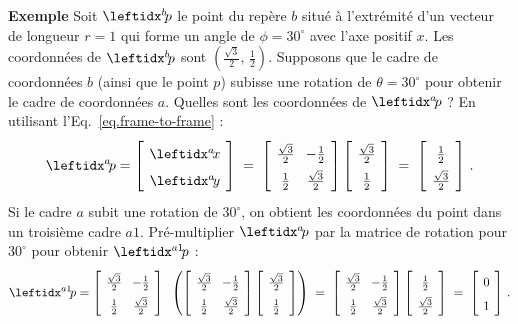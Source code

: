 \noindent\textbf{Exemple} Soit $\bp$ le point du repère $b$ situé à l'extrémité d'un vecteur de longueur $r=1$ qui forme un angle de $\phi=30^{\circ}$ avec l'axe positif $x$. Les coordonnées de $\bp$ sont $\left(\frac{\sqrt{3}}{2},\,\frac{1}{2}\right)$. Supposons que le cadre de coordonnées $b$ (ainsi que le point $p$) subisse une rotation de $\theta=30^{\circ}$ pour obtenir le cadre de coordonnées $a$. Quelles sont les coordonnées de $\ap$ ? En utilisant l'Eq.~\ref{eq.frame-to-frame} :
\[
\spacearray
\ap=
\left[\begin{array}{c}\ax\\\ay\end{array}\right]\;=\;
\left[\begin{array}{cc}\frac{\sqrt{3}}{2}&-\frac{1}{2}\\\frac{1}{2}&\frac{\sqrt{3}}{2}\end{array}\right]
\left[\begin{array}{c}\frac{\sqrt{3}}{2}\\\frac{1}{2}\end{array}\right]\;=\;
\left[\begin{array}{c}\frac{1}{2}\\\frac{\sqrt{3}}{2}\end{array}\right]\,.
\]
Si le cadre $a$ subit une rotation de $30^{\circ}$, on obtient les coordonnées du point dans un troisième cadre $a1$. Pré-multiplier $\ap$ par la matrice de rotation pour $30^{\circ}$ pour obtenir $\aprimep$ :
\[
\spacearray
\aprimep = \left[\begin{array}{cc}\frac{\sqrt{3}}{2}&-\frac{1}{2}\\\frac{1}{2}&\frac{\sqrt{3}}{2}\end{array}\right]\;\;
\left(\left[\begin{array}{cc}\frac{\sqrt{3}}{2}&-\frac{1}{2}\\\frac{1}{2}&\frac{\sqrt{3}}{2}\end{array}\right]
\left[\begin{array}{c}\frac{\sqrt{3}}{2}\\\frac{1}{2}\end{array}\right]\right)\;=\;
\left[\begin{array}{cc}\frac{\sqrt{3}}{2}&-\frac{1}{2}\\\frac{1}{2}&\frac{\sqrt{3}}{2}\end{array}\right]
\left[\begin{array}{c}\frac{1}{2}\\\frac{\sqrt{3}}{2}\end{array}\right]\;=\;
\left[\begin{array}{c}0\\1\end{array}\right]\,.
\]

